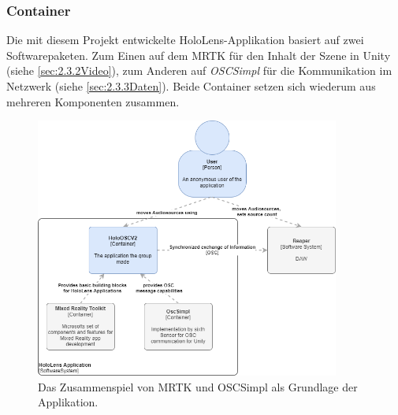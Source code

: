 \documentclass[11pt, titlepage, fleqn]{report}
\begin{document}
                \subsubsection*{Container}
                    Die mit diesem Projekt entwickelte HoloLens-Applikation basiert auf zwei Softwarepaketen. Zum Einen auf dem MRTK für 
                    den Inhalt der Szene in Unity (siehe \ref{sec:2.3.2Video}), 
                    zum Anderen 
                    auf \textit{OSCSimpl} für die Kommunikation im Netzwerk 
                    (siehe \ref{sec:2.3.3Daten}). 
                    Beide Container setzen sich wiederum aus mehreren Komponenten zusammen.
                    \begin{figure}[H]
                        \centering
                        \includegraphics[width=10cm]{./img/C4_Containers.png}
                        \caption[C4 Modell - Container]{Das Zusammenspiel von MRTK und OSCSimpl als Grundlage der Applikation. \label{fig:containerPic}}
                    \end{figure}
\end{document}
